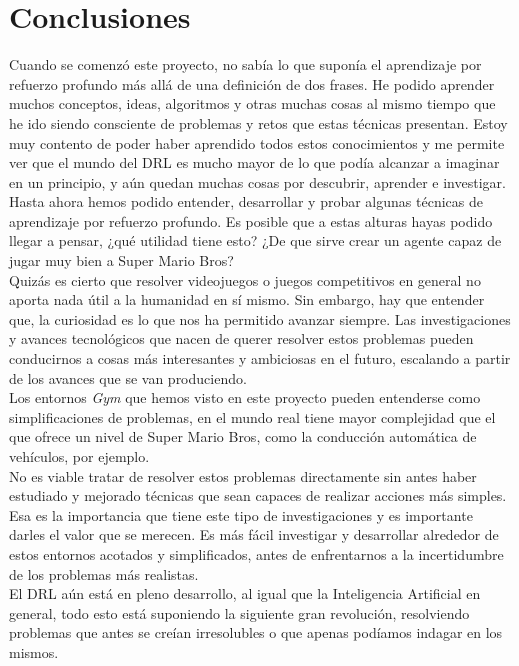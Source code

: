\documentclass[11pt,fleqn]{book} %
\begin{document}
\section{Conclusiones}

Cuando se comenzó este proyecto, no sabía lo que suponía el aprendizaje por refuerzo profundo más allá de una definición de dos frases. He podido aprender muchos conceptos, ideas, algoritmos y otras muchas cosas al mismo tiempo que he ido siendo consciente de problemas y retos que estas técnicas presentan. Estoy muy contento de poder haber aprendido todos estos conocimientos y me permite ver que el mundo del DRL es mucho mayor de lo que podía alcanzar a imaginar en un principio, y aún quedan muchas cosas por descubrir, aprender e investigar. \\

Hasta ahora hemos podido entender, desarrollar y probar algunas técnicas de aprendizaje por refuerzo profundo. Es posible que a estas alturas hayas podido llegar a pensar, ¿qué utilidad tiene esto? ¿De que sirve crear un agente capaz de jugar muy bien a Super Mario Bros? \\

Quizás es cierto que resolver videojuegos o juegos competitivos en general no aporta nada útil a la humanidad en sí mismo. Sin embargo, hay que entender que, la curiosidad es lo que nos ha permitido avanzar siempre. Las investigaciones y avances tecnológicos que nacen de querer resolver estos problemas pueden conducirnos a cosas más interesantes y ambiciosas en el futuro, escalando a partir de los avances que se van produciendo. \\

Los entornos \textit{Gym} que hemos visto en este proyecto pueden entenderse como simplificaciones de problemas, en el mundo real tiene mayor complejidad que el que ofrece un nivel de Super Mario Bros, como la conducción automática de vehículos, por ejemplo. \\

No es viable tratar de resolver estos problemas directamente sin antes haber estudiado y mejorado técnicas que sean capaces de realizar acciones más simples. Esa es la importancia que tiene este tipo de investigaciones y es importante darles el valor que se merecen. Es más fácil investigar y desarrollar alrededor de estos entornos acotados y simplificados, antes de enfrentarnos a la incertidumbre de los problemas más realistas. \\

El DRL aún está en pleno desarrollo, al igual que la Inteligencia Artificial en general, todo esto está suponiendo la siguiente gran revolución, resolviendo problemas que antes se creían irresolubles o que apenas podíamos indagar en los mismos. 
\end{document}
